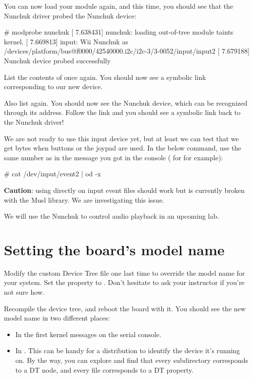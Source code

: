 You can now load your module again, and this time, you should see that
the Nunchuk driver probed the Nunchuk device:

\begin{bashinput}
# modprobe nunchuk
[    7.638431] nunchuk: loading out-of-tree module taints kernel.
[    7.669813] input: Wii Nunchuk as /devices/platform/bus@f0000/42540000.i2c/i2c-3/3-0052/input/input2
[    7.679188] Nunchuk device probed successfully
\end{bashinput}

List the contents of  once again. You
should now see a symbolic link corresponding to our new device.

Also list  again. You should now see the
Nunchuk device, which can be recognized through its  address.
Follow the link and you should see a symbolic link back to the Nunchuk
driver!

We are not ready to use this input device yet, but at least we can test
that we get bytes when buttons or the joypad are used. In the below
command, use the same number as in the message you got in the console
( for  for example):

\begin{bashinput}
# cat /dev/input/event2 | od -x
\end{bashinput}

{\bf Caution}: using  directly on input event files should
work but is currently broken with the Musl library. We are investigating
this issue.

We will use the Nunchuk to control audio playback in an upcoming lab.

\section{Setting the board's model name}

Modify the custom Device Tree file one last time to override the model
name for your system. Set the  property to
. Don't hesitate to ask your
instructor if you're not sure how.

Recompile the device tree, and reboot the board with it. You should see
the new model name in two different places:

\begin{itemize}
\item In the first kernel messages on the serial console.
\item In . This can be
      handy for a distribution to identify the device it's running on.
      By the way, you can explore  and
      find that every subdirectory corresponds to a DT node, and every
      file corresponds to a DT property.
\end{itemize}

